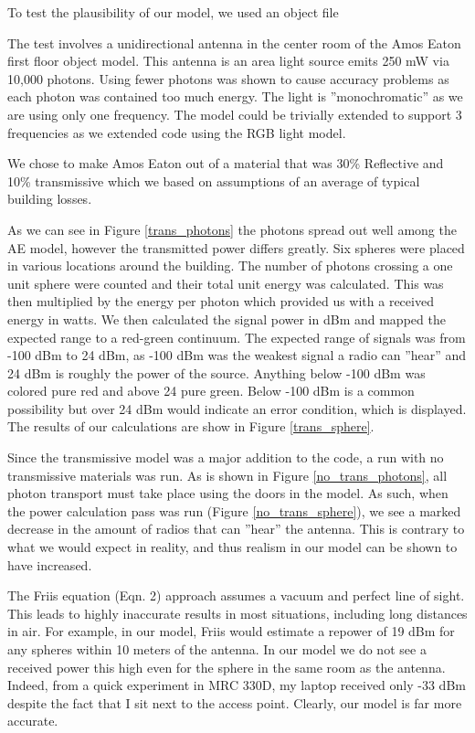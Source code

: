 \documentclass[%
        final,
        notitlepage,
        narroweqnarray,
        inline,
        twoside,
        ]{ieee}
\begin{document}
To test the plausibility of our model, we used an object file

The test involves a unidirectional antenna in the center room of the Amos Eaton
first floor object model. This antenna is an area light source emits 250 mW via 
10,000 photons. Using fewer photons was shown to cause accuracy problems as each
photon was contained too much energy. The light is ''monochromatic'' as we are 
using only one frequency. The model could be trivially extended to support 3 
frequencies as we extended code using the RGB light model.

We chose to make Amos Eaton out of a material that was 30\% Reflective and 10\%
transmissive which we based on assumptions of an average of typical building losses.

As we can see in Figure \ref{trans_photons} the photons spread out well among the AE model, however
the transmitted power differs greatly. Six spheres were placed in various locations around
the building. The number of photons crossing a one unit sphere were counted and their total 
unit energy was calculated. This was then multiplied by the energy per photon which provided
us with a received energy in watts. We then calculated the signal power in dBm and mapped the
expected range to a red-green continuum. The expected range of signals was from -100 dBm to 24 dBm,
as -100 dBm was the weakest signal a radio can ''hear'' and 24 dBm is roughly the power of the source.
Anything below -100 dBm was colored pure red and above 24 pure green. Below -100 dBm is a common 
possibility but over 24 dBm would indicate an error condition, which is displayed. The results of our
calculations are show in Figure \ref{trans_sphere}.

Since the transmissive model was a major addition to the code, a run with no transmissive materials was
run. As is shown in Figure \ref{no_trans_photons}, all photon transport must take place using the doors
in the model. As such, when the power calculation pass was run (Figure \ref{no_trans_sphere}), we see a marked decrease in the amount of radios that can ''hear'' the antenna. This is contrary to what we would expect in reality, and thus
realism in our model can be shown to have increased.
  
The Friis equation (Eqn. 2) approach assumes a vacuum and perfect line of sight.
This leads to highly inaccurate results in most situations, including long
distances in air. For example, in our model, Friis would estimate a repower of 19 dBm 
for any spheres within 10 meters of the antenna. In our model we do not see a received power 
this high even for the sphere in the same room as the antenna. Indeed, from a quick experiment in
MRC 330D, my laptop received only -33 dBm despite the fact that I sit next to the access point.
Clearly, our model is far more accurate.  
\end{document}
